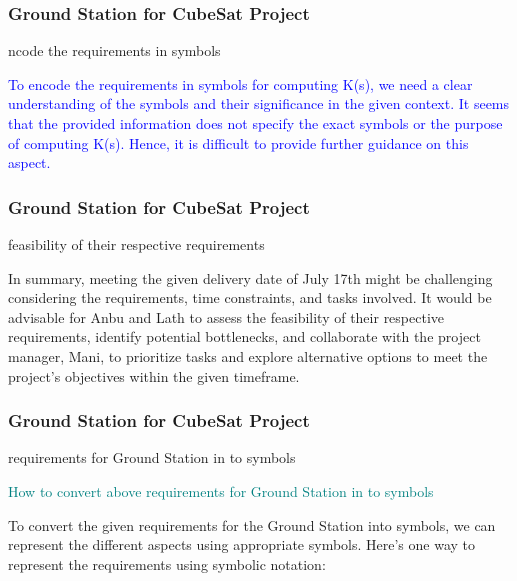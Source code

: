 \newpage
\begin{frame}
\frametitle{Ground Station for CubeSat Project }
\begin{block}{ncode the requirements in symbols}


\textcolor{blue}{To encode the requirements in symbols for computing K(s), we need a clear understanding of the symbols and their significance in the given context. It seems that the provided information does not specify the exact symbols or the purpose of computing K(s). Hence, it is difficult to provide further guidance on this aspect.}





 
\end{block}
\end{frame}



\newpage
\begin{frame}
\frametitle{Ground Station for CubeSat Project }
\begin{block}{feasibility of their respective requirements}


\textcolor{blue!65}{In summary, meeting the given delivery date of July 17th might be challenging considering the requirements, time constraints, and tasks involved. It would be advisable for Anbu and Lath to assess the feasibility of their respective requirements, identify potential bottlenecks, and collaborate with the project manager, Mani, to prioritize tasks and explore alternative options to meet the project's objectives within the given timeframe.
 }




\end{block}
\end{frame}


\newpage
\begin{frame}
\frametitle{Ground Station for CubeSat Project }
\begin{block}{requirements for Ground Station  in to symbols }

\textcolor{teal}{
How to convert above requirements for Ground Station  in to symbols  }

To convert the given requirements for the Ground Station into symbols, we can represent the different aspects using appropriate symbols. Here's one way to represent the requirements using symbolic notation: 
 
\end{block}
\end{frame}

